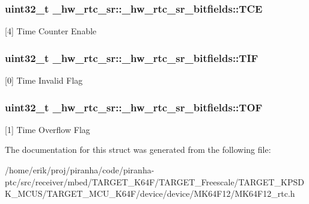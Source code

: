 \subsubsection[{\texorpdfstring{T\+CE}{TCE}}]{\setlength{\rightskip}{0pt plus 5cm}uint32\+\_\+t \+\_\+hw\+\_\+rtc\+\_\+sr\+::\+\_\+hw\+\_\+rtc\+\_\+sr\+\_\+bitfields\+::\+T\+CE}\hypertarget{struct__hw__rtc__sr_1_1__hw__rtc__sr__bitfields_a84c35e27b61dd7eb1bbaa590fce35486}{}\label{struct__hw__rtc__sr_1_1__hw__rtc__sr__bitfields_a84c35e27b61dd7eb1bbaa590fce35486}
\mbox{[}4\mbox{]} Time Counter Enable 
\subsubsection[{\texorpdfstring{T\+IF}{TIF}}]{\setlength{\rightskip}{0pt plus 5cm}uint32\+\_\+t \+\_\+hw\+\_\+rtc\+\_\+sr\+::\+\_\+hw\+\_\+rtc\+\_\+sr\+\_\+bitfields\+::\+T\+IF}\hypertarget{struct__hw__rtc__sr_1_1__hw__rtc__sr__bitfields_a3ba25655eeaea4c73c9d8bc551d02dcd}{}\label{struct__hw__rtc__sr_1_1__hw__rtc__sr__bitfields_a3ba25655eeaea4c73c9d8bc551d02dcd}
\mbox{[}0\mbox{]} Time Invalid Flag 
\subsubsection[{\texorpdfstring{T\+OF}{TOF}}]{\setlength{\rightskip}{0pt plus 5cm}uint32\+\_\+t \+\_\+hw\+\_\+rtc\+\_\+sr\+::\+\_\+hw\+\_\+rtc\+\_\+sr\+\_\+bitfields\+::\+T\+OF}\hypertarget{struct__hw__rtc__sr_1_1__hw__rtc__sr__bitfields_ab723f1615abdd527ae6545a38756bcca}{}\label{struct__hw__rtc__sr_1_1__hw__rtc__sr__bitfields_ab723f1615abdd527ae6545a38756bcca}
\mbox{[}1\mbox{]} Time Overflow Flag 

The documentation for this struct was generated from the following file\+:\begin{DoxyCompactItemize}
\item 
/home/erik/proj/piranha/code/piranha-\/ptc/src/receiver/mbed/\+T\+A\+R\+G\+E\+T\+\_\+\+K64\+F/\+T\+A\+R\+G\+E\+T\+\_\+\+Freescale/\+T\+A\+R\+G\+E\+T\+\_\+\+K\+P\+S\+D\+K\+\_\+\+M\+C\+U\+S/\+T\+A\+R\+G\+E\+T\+\_\+\+M\+C\+U\+\_\+\+K64\+F/device/device/\+M\+K64\+F12/M\+K64\+F12\+\_\+rtc.\+h\end{DoxyCompactItemize}
